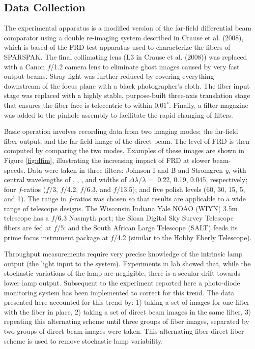 \subsection{Data Collection}
\label{FRD:sec:direct}
The experimental apparatus is a modified version of the far-field
differential beam comparator using a double re-imaging system
described in Crause et al. (2008)\cite{Crause_08}, which is
based of the FRD test apparatus used to characterize the fibers of
SPARSPAK\cite{Mab_04}. The final collimating lens (L3 in Crause et
al. (2008)\cite{Crause_08}) was replaced with a Canon $f$/1.2 camera
lens to eliminate ghost images caused by very fast output beams. Stray
light was further reduced by covering everything downstream of the
focus plane with a black photographer's cloth. The fiber input stage
was replaced with a highly stable, purpose-built three-axis
translation stage that ensures the fiber face is telecentric to within
$0.01^{\circ}$. Finally, a filter magazine was added to the pinhole
assembly to facilitate the rapid changing of filters.

Basic operation involves recording data from two imaging modes; the
far-field fiber output, and the far-field image of the direct
beam. The level of FRD is then computed by comparing the two modes.
Examples of these images are shown in Figure \ref{fig:dfim},
illustrating the increasing impact of FRD at slower beam-speeds. Data
were taken in three filters: Johnson I and B and Stromgren \emph{y},
with central wavelengths of \filtI, \filtB, \filty, and widths of
$\Delta\lambda/\lambda=$ 0.22, 0.19, 0.045, respectively; four
$f$-ratios ($f$/3, $f$/4.2, $f$/6.3, and $f$/13.5); and five polish
levels (60, 30, 15, 5, and 1\mum). The range in $f$-ratios was chosen
so that results are applicable to a wide range of telescope
designs. The Wisconsin Indiana Yale NOAO (WIYN) 3.5m telescope has a
$f$/6.3 Nasmyth port; the Sloan Digital Sky Survey Telescope fibers
are fed at $f$/5; and the South African Large Telescope (SALT) feeds its
prime focus instrument package at $f$/4.2 (similar to the Hobby Eberly
Telescope).

Throughput measurements require very precise knowledge of the
intrinsic lamp output (the light input to the system). Experiments in
lab showed that, while the stochastic variations of the lamp are
negligible, there is a secular drift towards lower lamp
output. Subsequent to the experiment reported here a photo-diode
monitoring system has been implemented to correct for this trend. The
data presented here accounted for this trend by: 1) taking a set of
images for one filter with the fiber in place, 2) taking a set of
direct beam images in the same filter, 3) repeating this alternating
scheme until three groups of fiber images, separated by two groups of
direct beam images were taken. This alternating fiber-direct-fiber
scheme is used to remove stochastic lamp variability.

